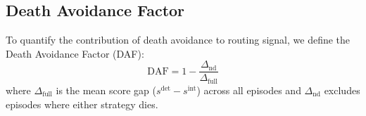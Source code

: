 \subsection{Death Avoidance Factor}
\label{sec:daf}

To quantify the contribution of death avoidance to routing signal, we define the Death Avoidance Factor (DAF):
\begin{equation}
    \text{DAF} = 1 - \frac{\Delta_{\text{nd}}}{\Delta_{\text{full}}}
\end{equation}
where $\Delta_{\text{full}}$ is the mean score gap ($s^{\text{det}} - s^{\text{int}}$) across all episodes and $\Delta_{\text{nd}}$ excludes episodes where either strategy dies.
